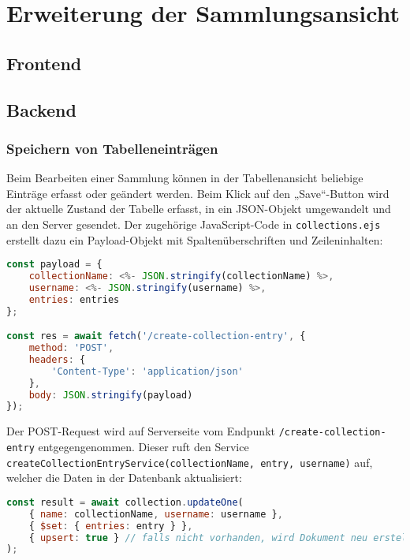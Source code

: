 \section{Erweiterung der Sammlungsansicht}\label{sec:erweiterung-der-sammlungsansicht}

\subsection{Frontend}

\subsection{Backend}

\subsubsection{Speichern von Tabelleneinträgen}

Beim Bearbeiten einer Sammlung können in der Tabellenansicht beliebige Einträge erfasst oder geändert werden.
Beim Klick auf den „Save“-Button wird der aktuelle Zustand der Tabelle erfasst, in ein JSON-Objekt umgewandelt und an den Server gesendet.
Der zugehörige JavaScript-Code in \texttt{collections.ejs} erstellt dazu ein Payload-Objekt mit Spaltenüberschriften und Zeileninhalten:

\begin{lstlisting}[language=JavaScript, caption=Payload-Erstellung im Frontend]
const payload = {
    collectionName: <%- JSON.stringify(collectionName) %>,
    username: <%- JSON.stringify(username) %>,
    entries: entries
};

const res = await fetch('/create-collection-entry', {
    method: 'POST',
    headers: {
        'Content-Type': 'application/json'
    },
    body: JSON.stringify(payload)
});
\end{lstlisting}

Der POST-Request wird auf Serverseite vom Endpunkt \texttt{/create-collection-entry} entgegengenommen.
Dieser ruft den Service \texttt{createCollectionEntryService(collectionName, entry, username)} auf, welcher die Daten in der Datenbank aktualisiert:

\begin{lstlisting}[language=JavaScript, caption=Service-Logik zum Überschreiben von Einträgen]
const result = await collection.updateOne(
    { name: collectionName, username: username },
    { $set: { entries: entry } },
    { upsert: true } // falls nicht vorhanden, wird Dokument neu erstellt
);
\end{lstlisting}

